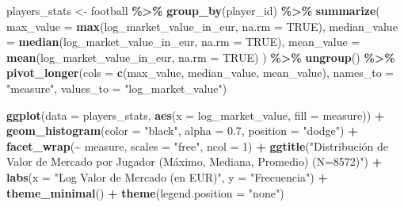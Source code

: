 \documentclass[
]{article}
\newenvironment{Shaded}{\begin{snugshade}}{\end{snugshade}}
\newcommand{\AttributeTok}[1]{\textcolor[rgb]{0.13,0.29,0.53}{#1}}
\newcommand{\ConstantTok}[1]{\textcolor[rgb]{0.56,0.35,0.01}{#1}}
\newcommand{\DecValTok}[1]{\textcolor[rgb]{0.00,0.00,0.81}{#1}}
\newcommand{\FloatTok}[1]{\textcolor[rgb]{0.00,0.00,0.81}{#1}}
\newcommand{\FunctionTok}[1]{\textcolor[rgb]{0.13,0.29,0.53}{\textbf{#1}}}
\newcommand{\NormalTok}[1]{#1}
\newcommand{\OtherTok}[1]{\textcolor[rgb]{0.56,0.35,0.01}{#1}}
\newcommand{\SpecialCharTok}[1]{\textcolor[rgb]{0.81,0.36,0.00}{\textbf{#1}}}
\newcommand{\StringTok}[1]{\textcolor[rgb]{0.31,0.60,0.02}{#1}}
\begin{document}
\begin{Shaded}
\begin{Highlighting}[]
\NormalTok{players\_stats }\OtherTok{\textless{}{-}}\NormalTok{ football }\SpecialCharTok{\%\textgreater{}\%}
  \FunctionTok{group\_by}\NormalTok{(player\_id) }\SpecialCharTok{\%\textgreater{}\%}
  \FunctionTok{summarize}\NormalTok{(}
    \AttributeTok{max\_value =} \FunctionTok{max}\NormalTok{(log\_market\_value\_in\_eur, }\AttributeTok{na.rm =} \ConstantTok{TRUE}\NormalTok{),}
    \AttributeTok{median\_value =} \FunctionTok{median}\NormalTok{(log\_market\_value\_in\_eur, }\AttributeTok{na.rm =} \ConstantTok{TRUE}\NormalTok{),}
    \AttributeTok{mean\_value =} \FunctionTok{mean}\NormalTok{(log\_market\_value\_in\_eur, }\AttributeTok{na.rm =} \ConstantTok{TRUE}\NormalTok{)}
\NormalTok{  ) }\SpecialCharTok{\%\textgreater{}\%}
  \FunctionTok{ungroup}\NormalTok{() }\SpecialCharTok{\%\textgreater{}\%}
  \FunctionTok{pivot\_longer}\NormalTok{(}\AttributeTok{cols =} \FunctionTok{c}\NormalTok{(max\_value, median\_value, mean\_value), }
               \AttributeTok{names\_to =} \StringTok{"measure"}\NormalTok{, }
               \AttributeTok{values\_to =} \StringTok{"log\_market\_value"}\NormalTok{)}

\FunctionTok{ggplot}\NormalTok{(}\AttributeTok{data =}\NormalTok{ players\_stats, }\FunctionTok{aes}\NormalTok{(}\AttributeTok{x =}\NormalTok{ log\_market\_value, }\AttributeTok{fill =}\NormalTok{ measure)) }\SpecialCharTok{+}
  \FunctionTok{geom\_histogram}\NormalTok{(}\AttributeTok{color =} \StringTok{"black"}\NormalTok{, }\AttributeTok{alpha =} \FloatTok{0.7}\NormalTok{, }\AttributeTok{position =} \StringTok{"dodge"}\NormalTok{) }\SpecialCharTok{+}
  \FunctionTok{facet\_wrap}\NormalTok{(}\SpecialCharTok{\textasciitilde{}}\NormalTok{ measure, }\AttributeTok{scales =} \StringTok{"free"}\NormalTok{, }\AttributeTok{ncol =} \DecValTok{1}\NormalTok{) }\SpecialCharTok{+}
  \FunctionTok{ggtitle}\NormalTok{(}\StringTok{"Distribución de Valor de Mercado por Jugador (Máximo, Mediana, Promedio) (N=8572)"}\NormalTok{) }\SpecialCharTok{+}
  \FunctionTok{labs}\NormalTok{(}\AttributeTok{x =} \StringTok{"Log Valor de Mercado (en EUR)"}\NormalTok{, }\AttributeTok{y =} \StringTok{"Frecuencia"}\NormalTok{) }\SpecialCharTok{+}
  \FunctionTok{theme\_minimal}\NormalTok{() }\SpecialCharTok{+}
  \FunctionTok{theme}\NormalTok{(}\AttributeTok{legend.position =} \StringTok{"none"}\NormalTok{)}
\end{Highlighting}
\end{Shaded}
\end{document}
